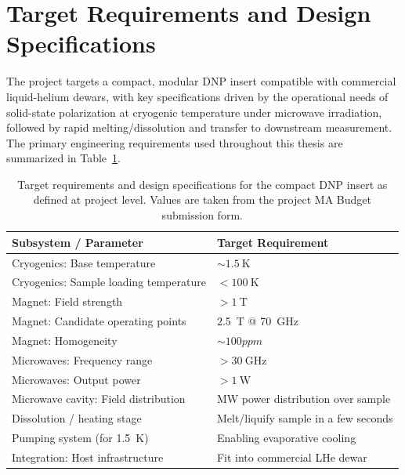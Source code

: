 \documentclass[FM,DP,EN,twoside]{tulthesis}
\begin{document}
\section{Target Requirements and Design Specifications}
\label{sec:target-requirements-design-specifications}

The project targets a compact, modular DNP insert compatible with commercial liquid-helium dewars, with key specifications driven by the operational needs of solid-state polarization at cryogenic temperature under microwave irradiation, followed by rapid melting/dissolution and transfer to downstream measurement. The primary engineering requirements used throughout this thesis are summarized in Table~\ref{table:target-requirements}.


\begin{table}[H]
  \centering
  \caption[Target Requirements for the Compact DNP Insert]{Target requirements and design specifications for the compact DNP insert as defined at project level. Values are taken from the project MA Budget submission form.}
  \label{table:target-requirements}
  \begin{tabular}{|l|l|}
    \hline
    \textbf{Subsystem / Parameter} & \textbf{Target Requirement} \\
    \hline
    Cryogenics: Base temperature & $\sim \SI{1.5}{\kelvin}$ \\
    \hline
    Cryogenics: Sample loading temperature & $< \SI{100}{\kelvin}$  \\
    \hline
    Magnet: Field strength & $> \SI{1}{\tesla}$ \\
    \hline
    Magnet: Candidate operating points & \SI{2.5}{\tesla} @ \SI{70}{\giga\hertz} \\
    \hline
    Magnet: Homogeneity & $\sim 100 ppm$  \\
    \hline
    Microwaves: Frequency range & $> \SI{30}{\giga\hertz}$ \\
    \hline
    Microwaves: Output power & $> \SI{1}{\watt}$ \\
    \hline
    Microwave cavity: Field distribution & MW power distribution over sample\\
    \hline
    Dissolution / heating stage & Melt/liquify sample in a few seconds \\
    \hline
    Pumping system (for \SI{1.5}{\kelvin}) & Enabling evaporative cooling \\
    \hline
    Integration: Host infrastructure & Fit into commercial LHe dewar \\
    \hline
  \end{tabular}
\end{table}
\end{document}
